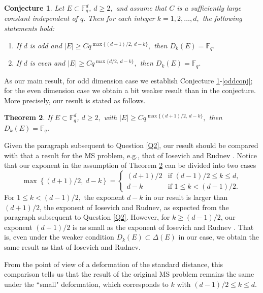 \documentclass[a4paper,11pt]{amsart}
\numberwithin{equation}{section}
\newtheorem{theorem}{Theorem}[section]
\newtheorem{conjecture}[theorem]{Conjecture}
\begin{document}
\begin{conjecture}\label{mcon}  Let $E\subset \mathbb F_q^d$, $d\ge 2,$ and  assume that $C$ is a sufficiently large constant independent of $q.$  Then for each integer $k=1,2, \ldots, d,$  the following statements hold:

\begin{enumerate}[label=\textup{(\roman*)}, ref=\textup{(\roman*)}]
\item \label{oddconj} If $d$ is odd and $|E|\ge C  q^{\max\{(d+1)/2, ~{d-k}\}},$   then $D_k(E) = \mathbb{F}_q.$
\item \label{evenconj}  If $d$ is even and $|E|\ge C  q^{\max\{d/2, ~{d-k}\}},$   then $D_k(E) = \mathbb{F}_q.$
\end{enumerate}
\end{conjecture}



As our main result,  for odd dimension case we establish Conjecture \ref{mcon}-\ref{oddconj};  for the even dimension case we obtain a bit weaker result than in the conjecture.  More precisely, our result is stated as follows.
\begin{theorem}\label{first}  
If $E\subset \mathbb F_q^d$, $d\ge 2,$ with $|E|\ge C  q^{\max\{(d+1)/2, ~{d-k}\}},$  then  $ D_k(E) = \mathbb{F}_q $.
\end{theorem}

Given the paragraph subsequent to Question \ref{Q2}, our result should be compared with that a result for the MS problem, e.g., that of  Iosevich and Rudnev \cite{IR07}.  
 Notice that our exponent in the assumption of Theorem \ref{first} can be divided into two cases
$$\max\left\{(d+1)/2, ~{d-k}\right\} =\left\{\begin{array}{ll}
(d+1)/2 & \text{if }  (d-1)/2 \le k \le d, \\
d-k & \text{if } 1\le k<(d-1)/2. \end{array} \right.$$
For  $1\le k< (d-1)/2,$ the exponent $d-k$ in our result is larger than $(d+1)/2$, the exponent of  Iosevich and Rudnev, as expected from the paragraph subsequent to Question \ref{Q2}. However, for  $k\ge (d-1)/2$, our exponent $ (d+1)/2$ is as small as  the exponent of Iosevich and Rudnev \cite{IR07}.
That is, even under the weaker condition   $D_k(E) \subset \Delta(E)$ in our case, we obtain the same result as that of Iosevich and Rudnev. 

From the point of view of a deformation of the standard distance, this comparison tells us that the result of the original MS problem remains the same under the ``small" deformation, which corresponds to $k$ with $ (d-1)/2 \le k \le d $.
\end{document}
